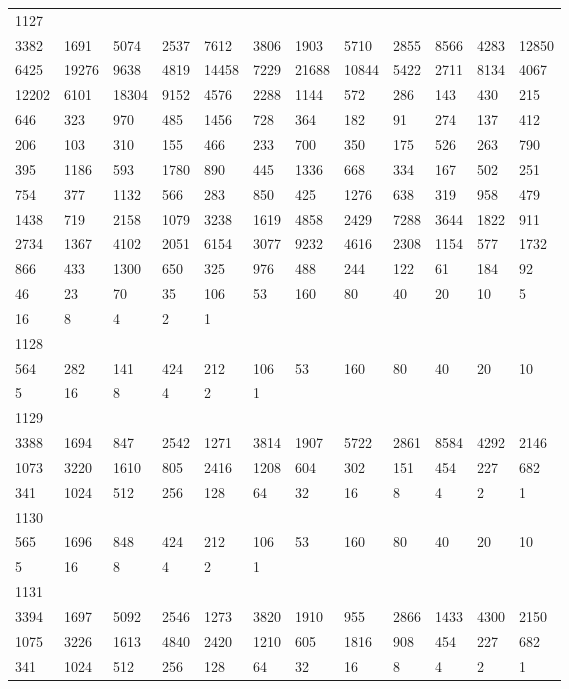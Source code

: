 \begin{longtable}{llllllllllll}
1127&&&&&&&&&&&\\
3382& 1691& 5074& 2537& 7612& 3806& 1903& 5710& 2855& 8566& 4283& 12850\\
6425& 19276& 9638& 4819& 14458& 7229& 21688& 10844& 5422& 2711& 8134& 4067\\
12202& 6101& 18304& 9152& 4576& 2288& 1144& 572& 286& 143& 430& 215\\
646& 323& 970& 485& 1456& 728& 364& 182& 91& 274& 137& 412\\
206& 103& 310& 155& 466& 233& 700& 350& 175& 526& 263& 790\\
395& 1186& 593& 1780& 890& 445& 1336& 668& 334& 167& 502& 251\\
754& 377& 1132& 566& 283& 850& 425& 1276& 638& 319& 958& 479\\
1438& 719& 2158& 1079& 3238& 1619& 4858& 2429& 7288& 3644& 1822& 911\\
2734& 1367& 4102& 2051& 6154& 3077& 9232& 4616& 2308& 1154& 577& 1732\\
866& 433& 1300& 650& 325& 976& 488& 244& 122& 61& 184& 92\\
46& 23& 70& 35& 106& 53& 160& 80& 40& 20& 10& 5\\
16& 8& 4& 2& 1& \\

1128&&&&&&&&&&&\\
564& 282& 141& 424& 212& 106& 53& 160& 80& 40& 20& 10\\
5& 16& 8& 4& 2& 1& \\

1129&&&&&&&&&&&\\
3388& 1694& 847& 2542& 1271& 3814& 1907& 5722& 2861& 8584& 4292& 2146\\
1073& 3220& 1610& 805& 2416& 1208& 604& 302& 151& 454& 227& 682\\
341& 1024& 512& 256& 128& 64& 32& 16& 8& 4& 2& 1\\

1130&&&&&&&&&&&\\
565& 1696& 848& 424& 212& 106& 53& 160& 80& 40& 20& 10\\
5& 16& 8& 4& 2& 1& \\

1131&&&&&&&&&&&\\
3394& 1697& 5092& 2546& 1273& 3820& 1910& 955& 2866& 1433& 4300& 2150\\
1075& 3226& 1613& 4840& 2420& 1210& 605& 1816& 908& 454& 227& 682\\
341& 1024& 512& 256& 128& 64& 32& 16& 8& 4& 2& 1\\


\end{longtable}
